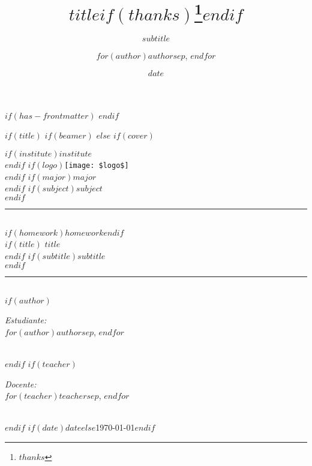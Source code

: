 \documentclass[
    $if(fontsize)$
      $fontsize$,
    $endif$
    $if(lang)$
      $babel-lang$,
    $endif$
    $if(papersize)$
      $papersize$paper,
    $endif$
    $if(beamer)$
        ignorenonframetext,
        $if(handout)$
          handout,
        $endif$
        $if(aspectratio)$
          aspectratio=$aspectratio$,
        $endif$
    $endif$
    $for(classoption)$
      $classoption$$sep$,
    $endfor$
]{$documentclass$}
\title{$title$$if(thanks)$\thanks{$thanks$}$endif$}
\subtitle{$subtitle$}
\author{$for(author)$$author$$sep$, $endfor$}
\date{$date$}
\institute{$for(institute)$$institute$$sep$, $endfor$}
\begin{document}
$if(has-frontmatter)$
\frontmatter
$endif$

$if(title)$
    $if(beamer)$
        \frame{\titlepage}
    $else$
        $if(cover)$
            \begin{titlepage}
            \newcommand{\HRule}{\rule{\linewidth}{0.5mm}}
            \center
            $if(institute)$\textsc{\LARGE $institute$}\\[0.5cm]$endif$
            $if(logo)$\texttt{[image: \$logo\$]}\\[1cm]$endif$
            $if(major)$\textsc{\Large $major$}\\$endif$
            $if(subject)$\textsc{\large $subject$}\\[0.5cm]$endif$
            \HRule \\[0.4cm]
            $if(homework)$$homework$$endif$\\[0.2cm]
            $if(title)${ \huge \bfseries $title$}\\[0.2cm]$endif$
            $if(subtitle)${\large $subtitle$}\\[0.4cm]$endif$
            \HRule \\[1cm]
            $if(author)$
                \begin{minipage}{0.4\textwidth}
                \begin{flushleft} \large
                \emph{Estudiante:}\\
                \textsc{$for(author)$$author$$sep$, $endfor$}
                \end{flushleft}
                \end{minipage}\\[1cm]
            $endif$
            $if(teacher)$
                \begin{minipage}{0.4\textwidth}
                \begin{flushright} \large
                \emph{Docente:}\\
                \textsc{$for(teacher)$$teacher$$sep$, $endfor$}
                \end{flushright}
                \end{minipage}\\[1cm]
            $endif$
            {\large $if(date)$$date$$else$\today$endif$}
            \vfill
            \end{titlepage}
\end{document}
